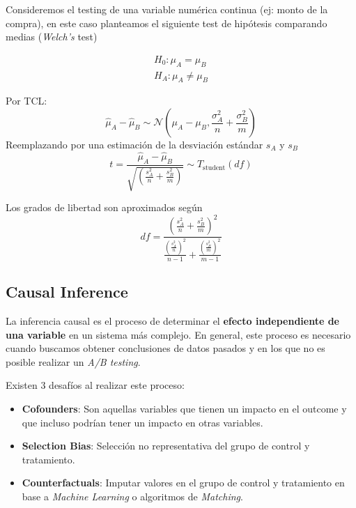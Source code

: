 Consideremos el testing de una variable numérica continua (ej: monto de la compra), en este caso planteamos el siguiente test de hipótesis comparando medias (\textit{Welch's} test)

\begin{equation*}
\begin{aligned}
    H_0: \mu_A = \mu_B \\ 
    H_A: \mu_A \neq \mu_B
\end{aligned}
\end{equation*}

Por TCL: 
$$
\hat{\mu}_A - \hat{\mu}_B \sim \mathcal{N} \left ( \mu_A - \mu_B , \frac{\sigma^2_A}{n} + \frac{\sigma^2_B}{m} \right )
$$
Reemplazando por una estimación de la desviación estándar $s_A$ y $s_B$
$$
t = \frac{\hat{\mu}_A - \hat{\mu}_B}{\sqrt{\left ( \frac{s^2_A}{n} + \frac{s^2_B}{m} \right )}} \sim T_{\text{student}}(df)
$$

Los grados de libertad son aproximados según 
$$
df = \frac{\left ( \frac{s^2_A}{n} + \frac{s^2_B}{m} \right )^2}{ \frac{\left(\frac{s^2_A}{n}\right)^2}{n-1} + \frac{\left(\frac{s^2_B}{m}\right )^2}{m-1}}
$$
\subsection{Causal Inference}

La inferencia causal es el proceso de determinar el \textbf{efecto independiente de una variable} en un sistema más complejo. En general, este proceso es necesario cuando buscamos obtener conclusiones de datos pasados y en los que no es posible realizar un \textit{A/B testing}.

Existen 3 desafíos al realizar este proceso: 
\begin{itemize}
    \item \textbf{Cofounders}: Son aquellas variables que tienen un impacto en el outcome y que incluso podrían tener un impacto en otras variables. 
    \item \textbf{Selection Bias}: Selección no representativa del grupo de control y tratamiento.
    \item \textbf{Counterfactuals}: Imputar valores en el grupo de control y tratamiento en base a \textit{Machine Learning} o algoritmos de \textit{Matching}. 
\end{itemize}

